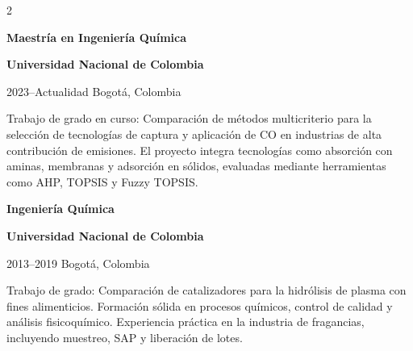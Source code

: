 \documentclass[10pt,a4paper]{altacv}
\renewcommand{\cvevent}[4]{%
  {\large\bfseries\color{emphasis}#1\par}
  \smallskip
  \textbf{\color{accent}#2}\par
  \smallskip
  {\small\faCalendar \hspace{0.5em}#3\hspace{2em}%
  \ifstrequal{#4}{}{}{\faMapMarker\hspace{0.5em}#4}\par}
  \medskip
}
\begin{document}
\begin{multicols}{2}
\vspace{-0.2cm}
\vspace{-0.3cm}
\cvevent{Maestría en Ingeniería Química}{Universidad Nacional de Colombia}{2023--Actualidad}{Bogotá, Colombia}
{\justifying Trabajo de grado en curso: Comparación de métodos multicriterio para la selección de tecnologías de captura y aplicación de CO en industrias de alta contribución de emisiones. El proyecto integra tecnologías como absorción con aminas, membranas y adsorción en sólidos, evaluadas mediante herramientas como AHP, TOPSIS y Fuzzy TOPSIS.\par}

\vspace{0.4cm}
\cvevent{Ingeniería Química}{Universidad Nacional de Colombia}{2013--2019}{Bogotá, Colombia}
{\justifying Trabajo de grado: Comparación de catalizadores para la hidrólisis de plasma con fines alimenticios. Formación sólida en procesos químicos, control de calidad y análisis fisicoquímico. Experiencia práctica en la industria de fragancias, incluyendo muestreo, SAP y liberación de lotes.\par}

\end{multicols}
\end{document}
